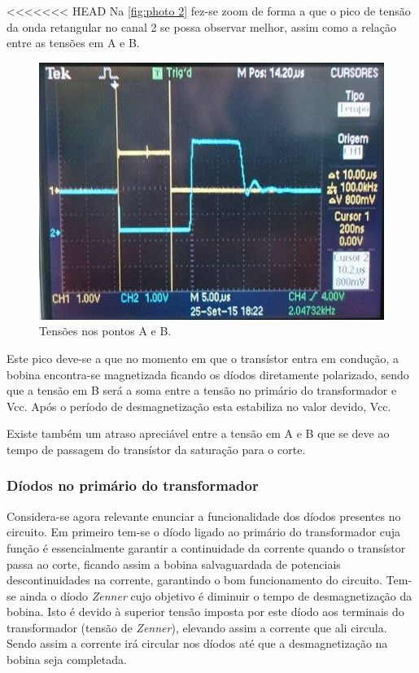 \documentclass[a4paper,11pt]{article}
\numberwithin{equation}{section}
\begin{document}
<<<<<<< HEAD
Na \autoref{fig:photo 2} fez-se zoom de forma a que o pico de tensão da onda retangular no canal 2 se possa observar melhor, assim como a relação entre as tensões em A e B.

\begin{figure}[h]
	\centering
	\includegraphics[keepaspectratio=true, scale=0.8]{img/fig5}
	\caption{Tensões nos pontos A e B.}
	\label{fig:photo 2}
	\vspace{-0.8em}
\end{figure}

Este pico deve-se a que no momento em que o transístor entra em condução, a bobina encontra-se magnetizada ficando os díodos diretamente polarizado, sendo que a tensão em B será a soma entre a tensão no primário do transformador e Vcc. Após o período de desmagnetização esta estabiliza no valor devido, Vcc. 

Existe também um atraso apreciável entre a tensão em A e B que se deve ao tempo de passagem do transístor da saturação para o corte.


\subsubsection{Díodos no primário do transformador}

Considera-se agora relevante enunciar a funcionalidade dos díodos presentes no circuito. Em primeiro tem-se o díodo ligado ao primário do transformador cuja função é essencialmente garantir a continuidade da corrente quando o transístor passa ao corte, ficando assim a bobina salvaguardada de potenciais descontinuidades na corrente, garantindo o bom funcionamento do circuito. Tem-se ainda o díodo \textit{Zenner} cujo objetivo é diminuir o tempo de desmagnetização da bobina. Isto é devido à superior tensão imposta por este díodo aos terminais do transformador (tensão de \textit{Zenner}), elevando assim a corrente que ali circula. Sendo assim a corrente irá circular nos díodos até que a desmagnetização na bobina seja completada.
\end{document}
